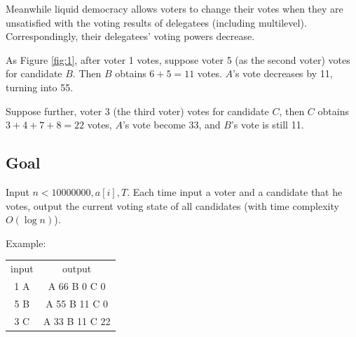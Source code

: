 Meanwhile liquid democracy allows voters to change their votes when they are unsatisfied with the voting results of delegatees (including multilevel). Correspondingly, their delegatees' voting powers decrease.

As Figure \ref{fig:1}, after voter 1 votes, suppose voter 5 (as the second voter) votes for candidate $B$. Then $B$ obtains $6+5=11$ votes. $A$'s vote decreases by 11, turning into 55.

Suppose further, voter 3 (the third voter) votes for candidate $C$, then $C$ obtains $3+4+7+8=22$ votes, $A$'s  vote become 33, and $B$'s vote is still 11.

\subsection{Goal}
Input $n<10000000,a[i],T$. Each time input a voter and a candidate that he votes, output the current voting state of all candidates (with time complexity $O(\log n)$).

Example:

\begin{tabular}{|c|c|}
input & output \\
1 A			&		A 66 B 0 C 0
\\
5 B			&		A 55 B 11 C 0
\\
3 C			&		A 33 B 11 C 22
\end{tabular}


